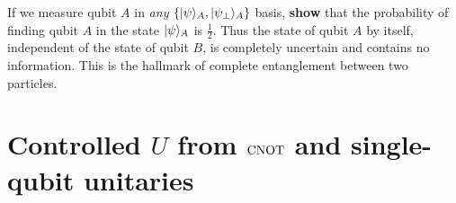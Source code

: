 \documentclass{../phys084}
\begin{document}
\begin{exercise}
\begin{problems}
  \item If we measure qubit \(A\) in \textit{any}
    \(\set*{\ket \psi_A, \ket{\psi_\perp}_A}\) basis, \textbf{show}
    that the probability of finding qubit \(A\) in the state
    \(\ket \psi_A\) is \(\frac 1 2\).  Thus the state of qubit \(A\)
    by itself, independent of the state of qubit \(B\), is completely
    uncertain and contains no information.  This is the hallmark of
    complete entanglement between two particles.
  \end{problems}
\end{exercise}

\begin{solution}
  \begin{problems}
  \item
  \item
  \item
  \end{problems}
\end{solution}

\section{Controlled \(U\) from \(\CNOT\) and single-qubit unitaries}
\end{document}
